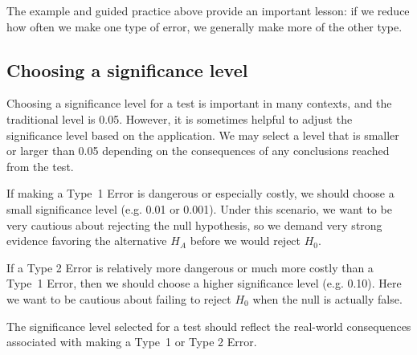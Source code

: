 
The example and guided practice above provide an important lesson: if we reduce how often we make one type of error, we generally make more of the other type.



\subsection{Choosing a significance level}
\label{significanceLevel}


Choosing a significance level for a test is important in many contexts, and the traditional level is 0.05. However, it is sometimes helpful to adjust the significance level based on the application. We may select a level that is smaller or larger than 0.05 depending on the consequences of any conclusions reached from the test.

If making a Type~1 Error is dangerous or especially costly, we should choose a small significance level (e.g. 0.01 or 0.001). Under this scenario, we want to be very cautious about rejecting the null hypothesis, so we demand very strong evidence favoring the alternative $H_A$ before we would reject $H_0$.

If a Type 2 Error is relatively more dangerous or much more costly than a Type~1 Error, then we should choose a higher significance level (e.g. 0.10). Here we want to be cautious about failing to reject $H_0$ when the null is actually false.

\begin{tipBox}{
The significance level selected for a test should reflect the real-world consequences associated with making a Type~1 or Type 2 Error.}
\end{tipBox}


